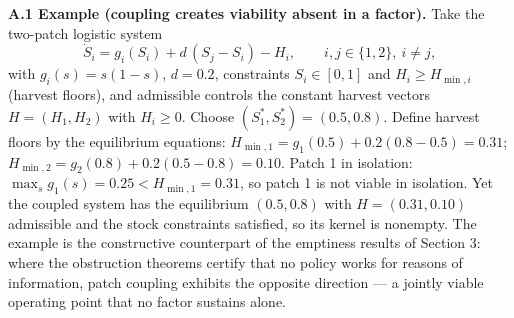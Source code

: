 \documentclass[11pt]{article}
\begin{document}
\textbf{A.1 Example (coupling creates viability absent in a factor).}
Take the two-patch logistic system
\[\dot S_i = g_i(S_i) + d\,(S_j - S_i) - H_i, \qquad i, j \in \{1,2\},\ i \ne j,\]
with \(g_i(s) = s(1-s)\), \(d = 0.2\), constraints \(S_i \in [0,1]\) and
\(H_i \ge H_{\min,i}\) (harvest floors), and admissible controls the
constant harvest vectors \(H = (H_1, H_2)\) with \(H_i \ge 0\). Choose
\((S_1^*, S_2^*) = (0.5, 0.8)\). Define harvest floors by the
equilibrium equations:
\(H_{\min,1} = g_1(0.5) + 0.2(0.8 - 0.5) = 0.31\);
\(H_{\min,2} = g_2(0.8) + 0.2(0.5 - 0.8) = 0.10\). Patch 1 in isolation:
\(\max_s g_1(s) = 0.25 < H_{\min,1} = 0.31\), so patch 1 is not viable
in isolation. Yet the coupled system has the equilibrium \((0.5, 0.8)\)
with \(H = (0.31, 0.10)\) admissible and the stock constraints
satisfied, so its kernel is nonempty. The example is the constructive
counterpart of the emptiness results of Section 3: where the obstruction
theorems certify that no policy works for reasons of information, patch
coupling exhibits the opposite direction --- a jointly viable operating
point that no factor sustains alone.
\end{document}
